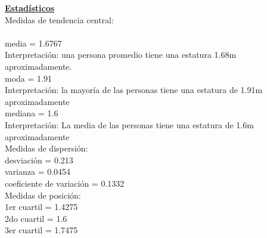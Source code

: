 \documentclass[a4paper,12pt]{article}
\begin{document}
\begin{enumerate}
\textbf{\underline{Estad\'isticos}} \\

Medidas de tendencia central:\\\\
media = 1.6767\\
Interpretaci\'on: una persona promedio tiene una estatura 1.68m aproximadamente.\\
moda =  1.91\\
Interpretaci\'on: la mayor\'ia de las personas tiene una estatura de 1.91m aproximadamente\\
mediana =  1.6\\
Interpretación: La media de las personas tiene una estatura de 1.6m aproximadamente\\

Medidas de dispersi\'on:\\
desviaci\'on = 0.213\\
varianza = 0.0454\\
coeficiente de variaci\'on = 0.1332\\

Medidas de posici\'on:\\
1er cuartil = 1.4275\\
2do cuartil = 1.6\\
3er cuartil = 1.7475\\


\end{enumerate}
\end{document}
